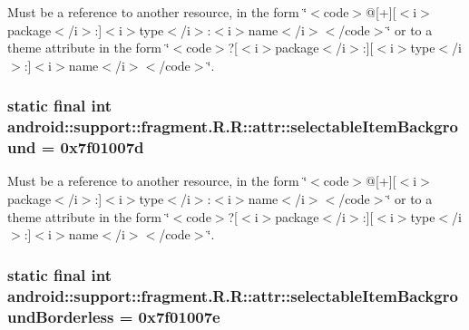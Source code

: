 Must be a reference to another resource, in the form \char`\"{}$<$code$>$@\mbox{[}+\mbox{]}\mbox{[}$<$i$>$package$<$/i$>$:\mbox{]}$<$i$>$type$<$/i$>$:$<$i$>$name$<$/i$>$$<$/code$>$\char`\"{} or to a theme attribute in the form \char`\"{}$<$code$>$?\mbox{[}$<$i$>$package$<$/i$>$:\mbox{]}\mbox{[}$<$i$>$type$<$/i$>$:\mbox{]}$<$i$>$name$<$/i$>$$<$/code$>$\char`\"{}. \hypertarget{classandroid_1_1support_1_1fragment_1_1_r_1_1attr_de331c6b3534207c15e2eb80badb87c6}{
\subsubsection[{selectableItemBackground}]{\setlength{\rightskip}{0pt plus 5cm}static final int android::support::fragment.R.R::attr::selectableItemBackground = 0x7f01007d}}
\label{classandroid_1_1support_1_1fragment_1_1_r_1_1attr_de331c6b3534207c15e2eb80badb87c6}


Must be a reference to another resource, in the form \char`\"{}$<$code$>$@\mbox{[}+\mbox{]}\mbox{[}$<$i$>$package$<$/i$>$:\mbox{]}$<$i$>$type$<$/i$>$:$<$i$>$name$<$/i$>$$<$/code$>$\char`\"{} or to a theme attribute in the form \char`\"{}$<$code$>$?\mbox{[}$<$i$>$package$<$/i$>$:\mbox{]}\mbox{[}$<$i$>$type$<$/i$>$:\mbox{]}$<$i$>$name$<$/i$>$$<$/code$>$\char`\"{}. \hypertarget{classandroid_1_1support_1_1fragment_1_1_r_1_1attr_bcd1fa2ed33938de07da2f715bfc8a7f}{
\subsubsection[{selectableItemBackgroundBorderless}]{\setlength{\rightskip}{0pt plus 5cm}static final int android::support::fragment.R.R::attr::selectableItemBackgroundBorderless = 0x7f01007e}}
\label{classandroid_1_1support_1_1fragment_1_1_r_1_1attr_bcd1fa2ed33938de07da2f715bfc8a7f}


